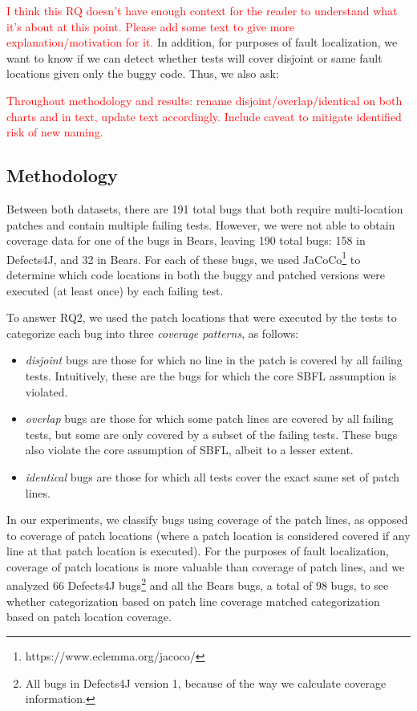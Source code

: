 \documentclass[10pt, conference]{IEEEtran}
\newcommand\todo[1]{\textcolor{red}{#1}}
\begin{document}
\todo{I think this RQ doesn't have enough context for the reader to understand
  what it's about at this point.  Please add some text to give more
  explanation/motivation for it.}
In addition, for purposes of fault localization, we want to know if we can detect 
whether tests will cover disjoint or same fault locations given only the buggy code. 
Thus, we also ask:


\todo{Throughout methodology and results: rename disjoint/overlap/identical on
  both charts and in text, update text accordingly.  Include caveat to mitigate
  identified risk of new naming.}

\subsection{Methodology}

Between both datasets, there are 191 total bugs that both require multi-location
patches and contain multiple failing tests. However, we were not able to obtain coverage 
data for one of the bugs in Bears, leaving 190 total bugs: 158 in Defects4J, and 32 in
Bears. 
For each of these bugs, we used JaCoCo\footnote{https://www.eclemma.org/jacoco/}
to determine which code locations in both the buggy and patched versions were executed
(at least once) by each failing test.

To answer RQ2, we used the patch locations that were executed by the tests to categorize 
each bug into three \emph{coverage patterns}, as follows:
\begin{itemize}
\item \emph{disjoint} bugs are those for which no line in the patch is covered by all
failing tests.  Intuitively, these are the bugs for which the core SBFL
assumption is violated.
\item \emph{overlap} bugs are those for which some patch lines are covered
by all failing tests, but some are only covered by a subset of the failing
tests. These bugs also violate the core assumption of SBFL, albeit to a lesser
extent.
\item \emph{identical} bugs are those for which all tests cover the exact same
  set of patch lines.
\end{itemize}

In our experiments, we classify bugs using coverage of the patch lines, as opposed to 
coverage of 
patch locations (where a patch location is considered covered if any line at that patch location 
is 
executed). For the purposes of fault localization, coverage of patch locations is more valuable 
than coverage of patch lines, and we analyzed 66 Defects4J bugs\footnote{All 
bugs in Defects4J version 1, because of the way we calculate coverage information.}
 and all the Bears bugs, a total of 98 bugs, to see whether categorization 
based on patch line 
coverage matched categorization based on patch location coverage.
\end{document}

